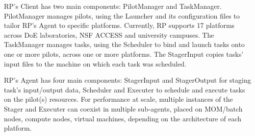 \documentclass[preprint,12pt, a4paper]{elsarticle}
\begin{document}


RP's Client has two main components: PilotManager and TaskManager. PilotManager
manages pilots, using the Launcher and its configuration files to tailor RP's
Agent to specific platforms. Currently, RP supports 17
platforms~\cite{rp-supported-url} across DoE laboratories, NSF ACCESS and
university campuses. The TaskManager manages tasks, using the Scheduler to bind
and launch tasks onto one or more pilots, across one or more platforms. The
StagerInput copies tasks' input files to the machine on which each task was
scheduled.


RP's Agent has four main components: StagerInput and StagerOutput for staging
task's input/output data, Scheduler and Executer to schedule and execute tasks
on the pilot(s) resources. For performance at scale, multiple instances of the
Stager and Executer can coexist in multiple sub-agents, placed on MOM/batch
nodes, compute nodes, virtual machines, depending on the architecture of each
platform.
\end{document}
